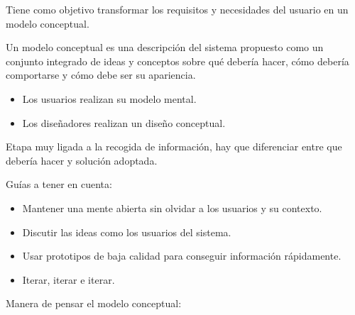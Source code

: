 \documentclass[12pt, twoside, openright]{report} %
\begin{document}
Tiene como objetivo transformar los requisitos y necesidades del
usuario en un modelo conceptual.

Un modelo conceptual es una descripción del sistema propuesto como
un conjunto integrado de ideas y conceptos sobre qué debería hacer,
cómo debería comportarse y cómo debe ser su apariencia.
\vspace{-0.5cm}
\begin{itemize}
	\item Los usuarios realizan su modelo mental.
	\item Los diseñadores realizan un diseño conceptual.
\end{itemize}

Etapa muy ligada a la recogida de información, hay que diferenciar
entre que debería hacer y solución adoptada.

Guías a tener en cuenta:
\vspace{-0.5cm}

\begin{itemize}
	\item Mantener una mente abierta sin olvidar a los usuarios y su
	      contexto.
	\item Discutir las ideas como los usuarios del sistema.
	\item Usar prototipos de baja calidad para conseguir información
	      rápidamente.
	\item Iterar, iterar e iterar.
\end{itemize}

Manera de pensar el modelo conceptual:
\end{document}
